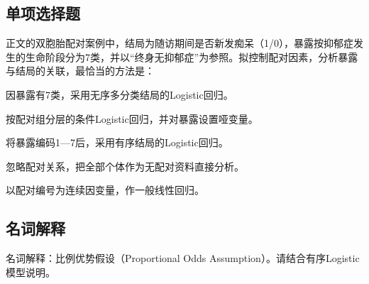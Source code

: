 \par\addvspace{8pt}\noindent\begin{minipage}{\linewidth}

\subsection{单项选择题}


正文的双胞胎配对案例中，结局为随访期间是否新发痴呆（1/0），暴露按抑郁症发生的生命阶段分为7类，并以“终身无抑郁症”为参照。拟控制配对因素，分析暴露与结局的关联，最恰当的方法是：

\begin{choices}

\item 因暴露有7类，采用无序多分类结局的Logistic回归。

\item 按配对组分层的条件Logistic回归，并对暴露设置哑变量。

\item 将暴露编码1—7后，采用有序结局的Logistic回归。

\item 忽略配对关系，把全部个体作为无配对资料直接分析。

\item 以配对编号为连续因变量，作一般线性回归。

\end{choices}

\end{minipage}\par\vspace{5pt}

\par\addvspace{8pt}\noindent\begin{minipage}{\linewidth}

\subsection{名词解释}


名词解释：比例优势假设（Proportional Odds Assumption）。请结合有序Logistic模型说明。


\end{minipage}\par\vspace{5pt}

